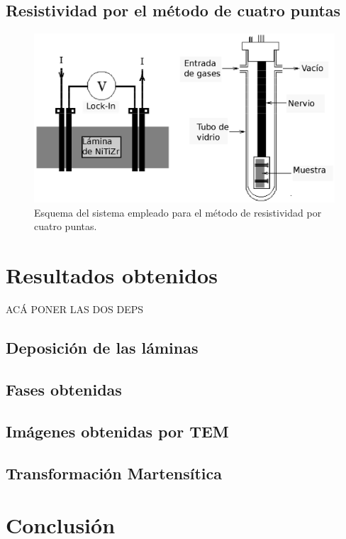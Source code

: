 \documentclass[11pt]{beamer}
\begin{document}
	\subsection{Resistividad por el método de cuatro puntas}
		\begin{frame}
			\begin{figure}[H]
				\centering
				\includegraphics[scale=0.1]{img/resistividad.eps}
				\caption{Esquema del sistema empleado para el método de 								 resistividad por cuatro puntas.}
				\label{magnetrones}
			\end{figure}
		\end{frame}
	
\section{Resultados obtenidos}
	\begin{frame}
	ACÁ PONER LAS DOS DEPS
	\end{frame}
	\subsection{Deposición de las láminas}
	\subsection{Fases obtenidas}
	\subsection{Imágenes obtenidas por TEM}
	\subsection{Transformación Martensítica}
\section{Conclusión}
\end{document}
